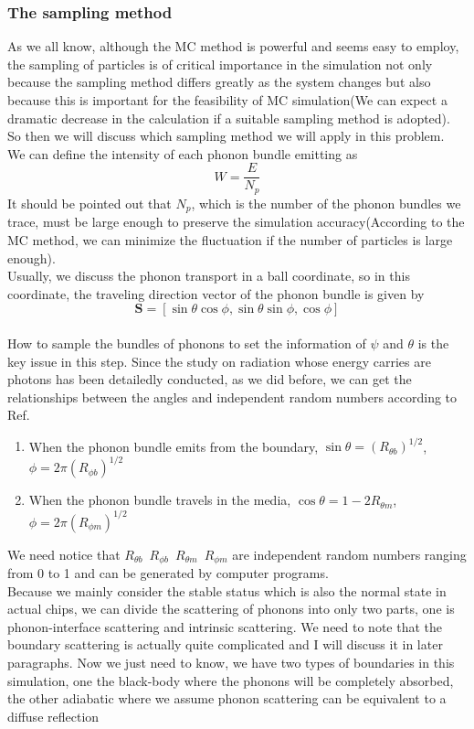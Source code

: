 \subsubsection{The sampling method}
As we all know, although the MC method is powerful and seems easy to employ, the sampling of particles is of critical importance in the simulation not only because the sampling method differs greatly as the system changes but also because this is important for the feasibility of MC simulation(We can expect a dramatic decrease in the calculation if a suitable sampling method is adopted). So then we will discuss which sampling method we will apply in this problem.\\
\indent We can define the intensity of each phonon bundle emitting as
\begin{equation} \label{eq5}
W=\frac{E}{N_p}
\end{equation}
It should be pointed out that $N_p$, which is the number of the phonon bundles we trace, must be large enough to preserve the simulation accuracy\cite{New}(According to the MC method, we can minimize the fluctuation if the number of particles is large enough).\\
\indent Usually, we discuss the phonon transport in a ball coordinate, so in this coordinate, the traveling direction vector of the phonon bundle is given by
\begin{equation}  \label{eq6}
\textbf{S}=[\sin{\theta}\cos{\phi},\sin{\theta}\sin{\phi},\cos{\phi}]
\end{equation} \\
How to sample the bundles of phonons to set the information of $\psi$ and $\theta$ is the key issue in this step. Since the study on radiation whose energy carries are photons has been detailedly conducted, as we did before, we can get the relationships between the angles and independent random numbers according to Ref\cite{}.
\begin{enumerate}
\item When the phonon bundle emits from the boundary, $\sin{\theta}=(R_{\theta b})^{1/2}$,~$\phi=2 \pi (R_{\phi b})^{1/2}$
\item When the phonon bundle travels in the media, $\cos{\theta}=1-2R_{\theta m}$,~$\phi=2 \pi (R_{\phi m})^{1/2}$
\end{enumerate}
We need notice that $R_{\theta b}$~$R_{\phi b}$~$R_{\theta m}$~$R_{\phi m}$ are independent random numbers ranging from 0 to 1 and can be generated by computer programs.\\
\indent Because we mainly consider the stable status which is also the normal state in actual chips, we can divide the scattering of phonons into only two parts, one is phonon-interface scattering and intrinsic scattering. We need to note that the boundary scattering is actually quite complicated and I will discuss it in later paragraphs. Now we just need to know, we have two types of boundaries in this simulation, one the black-body where the phonons will be completely absorbed, the other adiabatic where we assume phonon scattering can be equivalent to a diffuse reflection
